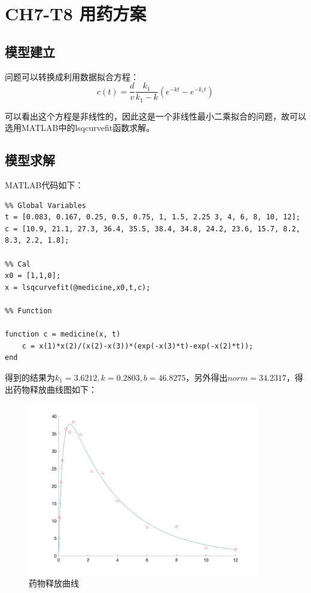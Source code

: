 \documentclass{article}
\begin{document}
\section{CH7-T8 用药方案}
\subsection{模型建立}
问题可以转换成利用数据拟合方程：
$$c(t)=\frac dv\frac{k_1}{k_1-k}(e^{-kt}-e^{-k_1t})$$

可以看出这个方程是非线性的，因此这是一个非线性最小二乘拟合的问题，故可以选用MATLAB中的lsqcurvefit函数求解。

\subsection{模型求解}
MATLAB代码如下：

\begin{lstlisting}
%% Global Variables
t = [0.083, 0.167, 0.25, 0.5, 0.75, 1, 1.5, 2.25 3, 4, 6, 8, 10, 12];
c = [10.9, 21.1, 27.3, 36.4, 35.5, 38.4, 34.8, 24.2, 23.6, 15.7, 8.2, 8.3, 2.2, 1.8];

%% Cal
x0 = [1,1,0];
x = lsqcurvefit(@medicine,x0,t,c);

%% Function

function c = medicine(x, t)
    c = x(1)*x(2)/(x(2)-x(3))*(exp(-x(3)*t)-exp(-x(2)*t));
end
\end{lstlisting}

得到的结果为$k_1=3.6212,k=0.2803,b=46.8275$，另外得出$norm=34.2317$，得出药物释放曲线图如下：


\begin{figure}[H]
    \centering
    \includegraphics[width=0.9\textwidth]{pic4.png}
    \caption{药物释放曲线}
\end{figure}
\end{document}
